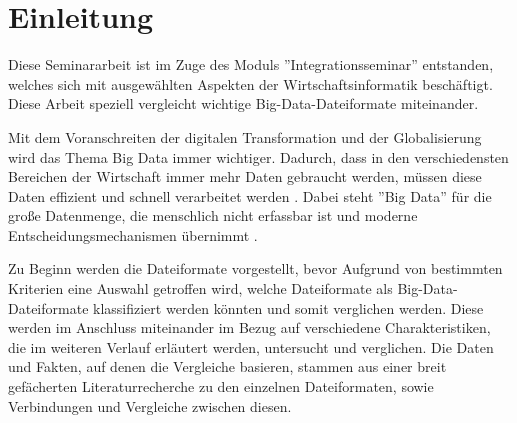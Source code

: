 \chapter{Einleitung}
Diese Seminararbeit ist im Zuge des Moduls ''Integrationsseminar'' entstanden, welches sich mit ausgewählten Aspekten der Wirtschaftsinformatik beschäftigt. Diese Arbeit speziell vergleicht wichtige Big-Data-Dateiformate miteinander.

Mit dem Voranschreiten der digitalen Transformation und der Globalisierung wird das Thema Big Data immer wichtiger. Dadurch, dass in den verschiedensten Bereichen der Wirtschaft immer mehr Daten gebraucht werden, müssen diese Daten effizient und schnell verarbeitet werden \cite{verbraucherzentralede_geschichte_nodate}. Dabei steht ''Big Data'' für die große Datenmenge, die menschlich nicht erfassbar ist und moderne Entscheidungsmechanismen übernimmt \cite{sap_was_nodate}. 

Zu Beginn werden die Dateiformate vorgestellt, bevor Aufgrund von bestimmten Kriterien eine Auswahl getroffen wird, welche Dateiformate als Big-Data-Dateiformate klassifiziert werden könnten und somit verglichen werden. Diese werden im Anschluss miteinander im Bezug auf verschiedene Charakteristiken, die im weiteren Verlauf erläutert werden, untersucht und verglichen. Die Daten und Fakten, auf denen die Vergleiche basieren, stammen aus einer breit gefächerten Literaturrecherche zu den einzelnen Dateiformaten, sowie Verbindungen und Vergleiche zwischen diesen. 
